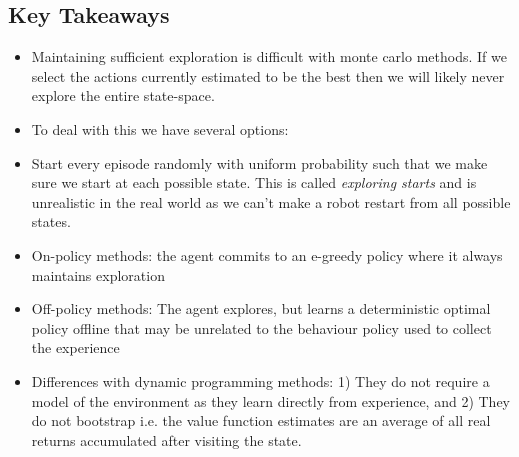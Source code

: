 \subsection{Key Takeaways}
\begin{itemize}
\item Maintaining sufficient exploration is difficult with monte carlo methods. If we select the actions currently estimated to be the best then we will likely never explore the entire state-space.
\item To deal with this we have several options:
\item Start every episode randomly with uniform probability such that we make sure we start at each possible state. This is called \textit{exploring starts} and is unrealistic in the real world as we can't make a robot restart from all possible states.
\item On-policy methods: the agent commits to an e-greedy policy where it always maintains exploration
\item Off-policy methods: The agent explores, but learns a deterministic optimal policy offline that may be unrelated to the behaviour policy used to collect the experience
\item Differences with dynamic programming methods: 1) They do not require a model of the environment as they learn directly from experience, and 2) They do not bootstrap i.e. the value function estimates are an average of all real returns accumulated after visiting the state.
\end{itemize}